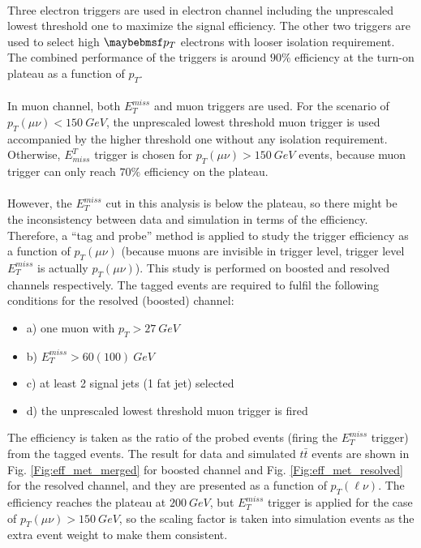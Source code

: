 \noindent
\\Three electron triggers are used in electron channel including the unprescaled lowest threshold one to maximize the signal efficiency. The other two triggers are used to select high $\p_{T}$ electrons with looser isolation requirement. The combined performance of the triggers is around $90\%$ efficiency at the turn-on plateau as a function of $p_{T}$.
\\
\\In muon channel, both $E_{T}^{miss}$ and muon triggers are used. For the scenario of $p_{T}(\mu\nu)<150~GeV$, the unprescaled lowest threshold muon trigger is used accompanied by the higher threshold one without any isolation requirement. Otherwise, $E^{T}_{miss}$ trigger is chosen for $p_{T}(\mu\nu)>150~GeV$ events, because muon trigger can only reach $70\%$ efficiency on the plateau.
\\
\\However, the $E^{miss}_{T}$ cut in this analysis is below the plateau, so there might be the inconsistency between data and simulation in terms of the efficiency. Therefore, a ``tag and probe'' method is applied to study the trigger efficiency as a function of $p_{T}(\mu\nu)$ (because muons are invisible in trigger level, trigger level $E_{T}^{miss}$ is actually $p_{T}(\mu\nu)$). This study is performed on boosted and resolved channels respectively. The tagged events are required to fulfil the following conditions for the resolved (boosted) channel:
\begin{itemize}
	\item[] a) one muon with $p_{T}>27~GeV$
	\item[] b) $E^{miss}_{T}>60(100)~GeV$
	\item[] c) at least 2 signal jets (1 fat jet) selected
	\item[] d) the unprescaled lowest threshold muon trigger is fired
\end{itemize}
The efficiency is taken as the ratio of the probed events (firing the $E^{miss}_{T}$ trigger) from the tagged events. The result for data and simulated $t\bar{t}$ events are shown in Fig. \ref{Fig:eff_met_merged} for boosted channel and Fig. \ref{Fig:eff_met_resolved} for the resolved channel, and they are presented as a function of $p_{T}(\ell\nu)$. The efficiency reaches the plateau at $200~GeV$, but $E^{miss}_{T}$ trigger is applied for the case of $p_{T}(\mu\nu)>150~GeV$, so the scaling factor is taken into simulation events as the extra event weight to make them consistent. 
